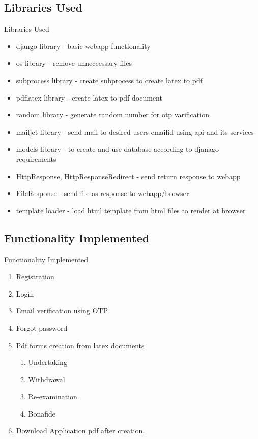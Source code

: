 \documentclass [] {beamer}
\begin{document}
\subsection{Libraries Used}
\begin{frame}{Libraries Used}

\begin{itemize}
    \item django library   - basic webapp functionality
    \item os library - remove unneccessary files
    \item subprocess library - create subprocess to create latex to pdf
    \item pdflatex library - create latex to pdf document
    \item random library - generate random number for otp varification
\item mailjet library - send mail to desired users emailid using api and its services
\item models library - to create and use database according to djanago requirements
\item HttpResponse, HttpResponseRedirect -  send return response to webapp 
\item FileResponse - send file as response to webapp/browser
\item template loader - load html template from html files to render at browser
\end{itemize}


 
\end{frame}


\subsection{Functionality Implemented}
\begin{frame}{Functionality Implemented}
\begin{enumerate}
    \item Registration
    \item Login
    \item Email verification using OTP
    \item Forgot password
    \item Pdf forms creation from latex documents
    \begin{enumerate}
        \item Undertaking
        \item Withdrawal
        \item Re-examination.
        \item Bonafide

    \end{enumerate}
    \item Download Application pdf after creation.
\end{enumerate}







\end{frame}
\end{document}
